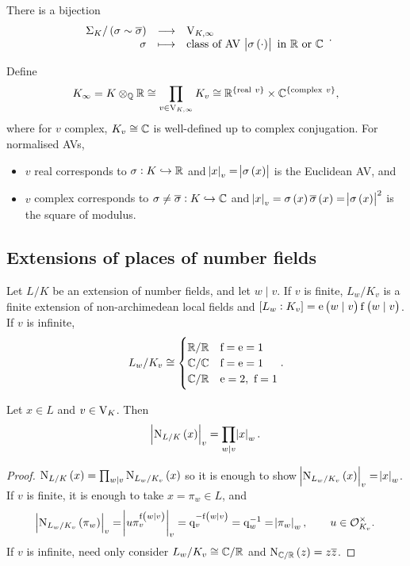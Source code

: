\begin{theorem}
There is a bijection
$$ \function{\Sigma_K / \br{\sigma \sim \overline{\sigma}}}{\V_{K, \infty}}{\sigma}{\text{class of AV} \ \abs{\sigma\br{\cdot}} \ \text{in} \ \RR \ \text{or} \ \CC}. $$
\end{theorem}

\pagebreak

\begin{notation*}
Define
$$ K_\infty = K \otimes_\QQ \RR \cong \prod_{v \in \V_{K, \infty}} K_v \cong \RR^{\cbr{\text{real} \ v}} \times \CC^{\cbr{\text{complex} \ v}}, $$
where for $ v $ complex, $ K_v \cong \mathbb{C} $ is well-defined up to complex conjugation. For normalised AVs,
\begin{itemize}
\item $ v $ real corresponds to $ \sigma : K \hookrightarrow \mathbb{R} $ and $ \abs{x}_v = \abs{\sigma\br{x}} $ is the Euclidean AV, and
\item $ v $ complex corresponds to $ \sigma \ne \overline{\sigma} : K \hookrightarrow \mathbb{C} $ and $ \abs{x}_v = \sigma\br{x}\overline{\sigma}\br{x} = \abs{\sigma\br{x}}^2 $ is the square of modulus.
\end{itemize}
\end{notation*}

\subsection{Extensions of places of number fields}

Let $ L / K $ be an extension of number fields, and let $ w \mid v $. If $ v $ is finite, $ L_w / K_v $ is a finite extension of non-archimedean local fields and $ \sbr{L_w : K_v} = \e\br{w \mid v}\f\br{w \mid v} $. If $ v $ is infinite,
$$ L_w / K_v \cong
\begin{cases}
\mathbb{R} / \mathbb{R} & \mathrm{f} = \mathrm{e} = 1 \\
\mathbb{C} / \mathbb{C} & \mathrm{f} = \mathrm{e} = 1 \\
\mathbb{C} / \mathbb{R} & \mathrm{e} = 2, \ \mathrm{f} = 1
\end{cases}.
$$


\begin{proposition}
Let $ x \in L $ and $ v \in \mathrm{V}_K $. Then
$$ \abs{\N_{L / K}\br{x}}_v = \prod_{w \mid v} \abs{x}_w. $$
\end{proposition}

\begin{proof}
$ \N_{L / K}\br{x} = \prod_{w \mid v} \N_{L_w / K_v}\br{x} $ so it is enough to show $ \abs{\N_{L_w / K_v}\br{x}}_v = \abs{x}_w $. If $ v $ is finite, it is enough to take $ x = \pi_w \in L $, and
$$ \abs{\N_{L_w / K_v}\br{\pi_w}}_v = \abs{u\pi_v^{\f\br{w \mid v}}}_v = \q_v^{-\f\br{w \mid v}} = \q_w^{-1} = \abs{\pi_w}_w, \qquad u \in \OOO_{K_v}^\times. $$
If $ v $ is infinite, need only consider $ L_w / K_v \cong \mathbb{C} / \mathbb{R} $ and $ \N_{\CC / \RR}\br{z} = z\overline{z} $.
\end{proof}

